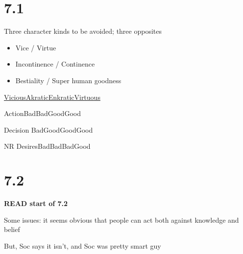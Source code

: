 \documentclass[11pt]{article}
\begin{document}
\section{7.1}

\noindent Three character kinds to be avoided; three opposites

\begin{itemize}\item{Vice / Virtue}\item{Incontinence / Continence}\item{Bestiality / Super human goodness}\end{itemize}
\newpage
\underline{\hspace*{10mm} Vicious\hspace*{10mm}Akratic\hspace*{10mm}Enkratic\hspace*{10mm}Virtuous}

\noindent Action\hspace*{8mm}Bad\hspace*{14mm}Bad\hspace*{15mm}Good\hspace*{17mm}Good
\vspace*{2mm}

\noindent Decision \hspace*{5mm}Bad\hspace*{13mm}Good\hspace*{14mm}Good\hspace*{16mm}Good
\vspace*{2mm}

\noindent NR Desires\hspace*{2mm}Bad\hspace*{12mm}Bad\hspace*{16mm}Bad\hspace*{17mm}Good
\vspace*{4mm}

\section{7.2}

\noindent\textbf{READ start of 7.2}
\vspace*{2mm}

\noindent Some issues: it seems obvious that people can act both against knowledge and belief
\vspace*{2mm}

\noindent But, Soc says it isn't, and Soc was pretty smart guy
\vspace*{2mm}
\end{document}
